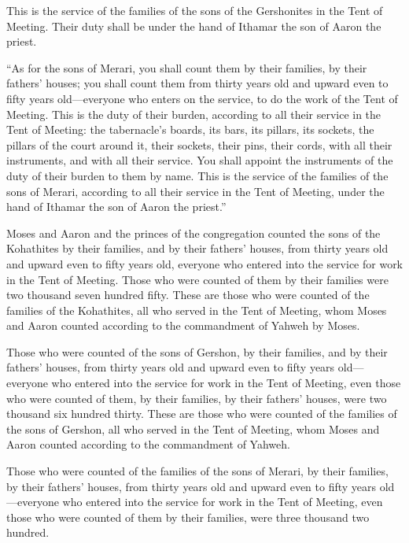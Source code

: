 {This is the service of the families of the sons of the Gershonites in the Tent of Meeting. Their duty shall be under the hand of Ithamar the son of Aaron the priest.
\par }{\PP {}“As for the sons of Merari, you shall count them by their families, by their fathers’ houses;
you shall count them from thirty years old and upward even to fifty years old—everyone who enters on the service, to do the work of the Tent of Meeting.
This is the duty of their burden, according to all their service in the Tent of Meeting: the tabernacle’s boards, its bars, its pillars, its sockets,
the pillars of the court around it, their sockets, their pins, their cords, with all their instruments, and with all their service. You shall appoint the instruments of the duty of their burden to them by name.
This is the service of the families of the sons of Merari, according to all their service in the Tent of Meeting, under the hand of Ithamar the son of Aaron the priest.”
\par }{\PP {}Moses and Aaron and the princes of the congregation counted the sons of the Kohathites by their families, and by their fathers’ houses,
from thirty years old and upward even to fifty years old, everyone who entered into the service for work in the Tent of Meeting.
Those who were counted of them by their families were two thousand seven hundred fifty.
These are those who were counted of the families of the Kohathites, all who served in the Tent of Meeting, whom Moses and Aaron counted according to the commandment of Yahweh by Moses.
\par }{\PP {}Those who were counted of the sons of Gershon, by their families, and by their fathers’ houses,
from thirty years old and upward even to fifty years old—everyone who entered into the service for work in the Tent of Meeting,
even those who were counted of them, by their families, by their fathers’ houses, were two thousand six hundred thirty.
These are those who were counted of the families of the sons of Gershon, all who served in the Tent of Meeting, whom Moses and Aaron counted according to the commandment of Yahweh.
\par }{\PP {}Those who were counted of the families of the sons of Merari, by their families, by their fathers’ houses,
from thirty years old and upward even to fifty years old—everyone who entered into the service for work in the Tent of Meeting,
even those who were counted of them by their families, were three thousand two hundred.
}
